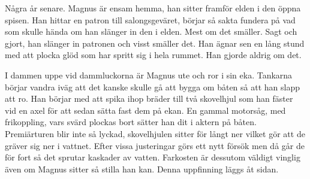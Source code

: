 Några år senare. Magnus är ensam hemma, han sitter framför elden i den öppna spisen. Han hittar en patron till salongsgeväret, börjar så sakta fundera på vad som skulle hända om han slänger in den i elden. Mest om det smäller. Sagt och gjort, han slänger in patronen och visst smäller det. Han ägnar sen en lång stund med att plocka glöd som har spritt sig i hela rummet. Han gjorde aldrig om det.

I dammen uppe vid dammluckorna är Magnus ute och ror i sin eka. Tankarna börjar vandra iväg att det kanske skulle gå att bygga om båten så att han slapp att ro. Han börjar med att spika ihop bräder till två skovelhjul som han fäster vid en axel för att sedan sätta fast dem på ekan. En gammal motorsåg, med frikoppling, vars svärd plockas bort sätter han dit i aktern på båten. Premiärturen blir inte så lyckad, skovelhjulen sitter för långt ner vilket gör att de gräver sig ner i vattnet. Efter vissa justeringar görs ett nytt försök men då går de för fort så det sprutar kaskader av vatten. Farkosten är dessutom väldigt vinglig även om Magnus sitter så stilla han kan. Denna uppfinning läggs åt sidan.


